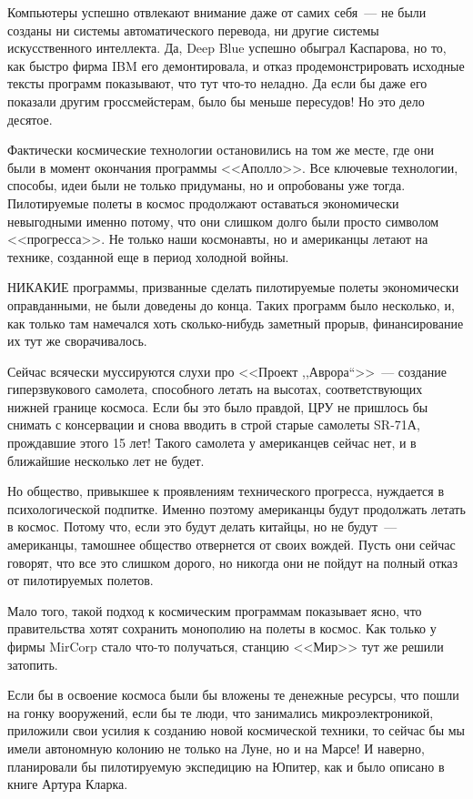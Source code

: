 \documentclass{scrbook}
\newcommand{\glqq}{,,}
\newcommand{\grqq}{``}
\newcommand{\flqq}{<<}
\newcommand{\frqq}{>>}
\newcommand{\mdash}{~--- }
\begin{document}
Компьютеры успешно отвлекают внимание даже от самих себя{\mdash}не были созданы ни системы автоматического перевода, ни другие системы искусственного интеллекта. Да, Deep Blue успешно обыграл Каспарова, но то, как быстро фирма IBM его демонтировала, и отказ продемонстрировать исходные тексты программ показывают, что тут что-то неладно. Да если бы даже его показали другим гроссмейстерам, было бы меньше пересудов! Но это дело десятое.

Фактически космические технологии остановились на том же месте, где они были в момент окончания программы {\flqq}Аполло{\frqq}. Все ключевые технологии, способы, идеи были не только придуманы, но и опробованы уже тогда. Пилотируемые полеты в космос продолжают оставаться экономически невыгодными именно потому, что они слишком долго были просто символом {\flqq}прогресса{\frqq}. Не только наши космонавты, но и американцы летают на технике, созданной еще в период холодной войны.

НИКАКИЕ программы, призванные сделать пилотируемые полеты экономически оправданными, не были доведены до конца. Таких программ было несколько, и, как только там намечался хоть сколько-нибудь заметный прорыв, финансирование их тут же сворачивалось.

Сейчас всячески муссируются слухи про {\flqq}Проект {\glqq}Аврора{\grqq}{\frqq}{\mdash}создание гиперзвукового самолета, способного летать на высотах, соответствующих нижней границе космоса. Если бы это было правдой, ЦРУ не пришлось бы снимать с консервации и снова вводить в строй старые самолеты SR-71А, прождавшие этого 15 лет! Такого самолета у американцев сейчас нет, и в ближайшие несколько лет не будет.

Но общество, привыкшее к проявлениям технического прогресса, нуждается в психологической подпитке. Именно поэтому американцы будут продолжать летать в космос. Потому что, если это будут делать китайцы, но не будут{\mdash}американцы, тамошнее общество отвернется от своих вождей. Пусть они сейчас говорят, что все это слишком дорого, но никогда они не пойдут на полный отказ от пилотируемых полетов.

Мало того, такой подход к космическим программам показывает ясно, что правительства хотят сохранить монополию на полеты в космос. Как только у фирмы MirCorp стало что-то получаться, станцию {\flqq}Мир{\frqq} тут же решили затопить.

Если бы в освоение космоса были бы вложены те денежные ресурсы, что пошли на гонку вооружений, если бы те люди, что занимались микроэлектроникой, приложили свои усилия к созданию новой космической техники, то сейчас бы мы имели автономную колонию не только на Луне, но и на Марсе! И наверно, планировали бы пилотируемую экспедицию на Юпитер, как и было описано в книге Артура Кларка.
\end{document}
